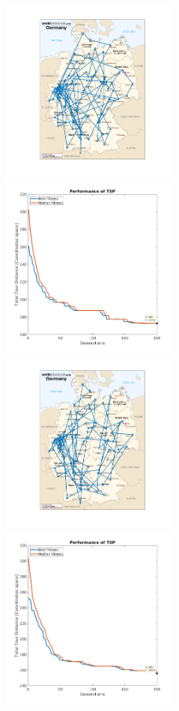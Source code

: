 \documentclass[a4paper, 12pt]{article}
\begin{document}
\begin{figure}[h!]
	\includegraphics[width=0.5\textwidth]{images/one_point_30_runs_ind.png}
	\includegraphics[width=0.5\textwidth]{images/one_point_30_runs_fit_med.png}
	\includegraphics[width=0.5\textwidth]{images/two_points_30_runs_ind.png}
	\includegraphics[width=0.5\textwidth]{images/two_points_30_runs_fit_med.png}

\end{figure}
\end{document}
